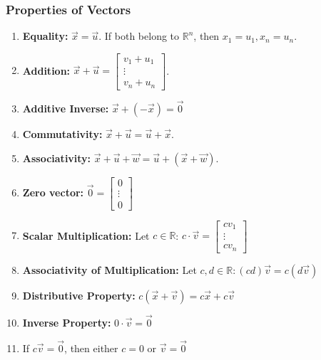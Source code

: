 \documentclass[11pt]{article}
\theoremstyle{plain}
\theoremstyle{remark}
\theoremstyle{plain}
\newcommand{\bd}{\textbf}
\newcommand{\rn}{\mathbb{R}}
\begin{document}
\subsubsection{Properties of Vectors}
\begin{enumerate}[label=\Roman*.]
    \item \bd{Equality:} $\overrightarrow{x} = \overrightarrow{u}$. If both belong to $\rn^n$, then $x_1 = u_1, x_n = u_n$.
    \item \bd{Addition:} $\overrightarrow{x} + \overrightarrow{u} = 
    \begin{bmatrix}
        v_1 + u_1 \\
        \vdots
        \\
        v_n + u_n
    \end{bmatrix}$.
    \item \bd{Additive Inverse:} $\overrightarrow{x} + (-\overrightarrow{x}) = \overrightarrow{0}$
    \item \bd{Commutativity:} $\overrightarrow{x} + \overrightarrow{u} = \overrightarrow{u} + \overrightarrow{x}$.
    \item \bd{Associativity:} $\overrightarrow{x} + \overrightarrow{u} + \overrightarrow{w} = \overrightarrow{u} + (\overrightarrow{x} + \overrightarrow{w})$.
    \item \bd{Zero vector:} $\overrightarrow{0} = \begin{bmatrix}
        0 \\\vdots \\0
    \end{bmatrix}$
    \item \bd{Scalar Multiplication:} Let $c\in\rn$: $ c\cdot \overrightarrow{v} = \begin{bmatrix}
        cv_1\\\vdots\\cv_n
    \end{bmatrix}$
    \item \bd{Associativity of Multiplication:} Let $c,d \in \rn: (cd)\overrightarrow{v} = c(d\overrightarrow{v})$
    \item \bd{Distributive Property:} $c(\overrightarrow{x} + \overrightarrow{v}) = c\overrightarrow{x} + c\overrightarrow{v}$
    \item \bd{Inverse Property:} $0 \cdot \overrightarrow{v} = \overrightarrow{0}$
    \item If $c\overrightarrow{v} = \overrightarrow{0}$, then either $c = 0$ or $\overrightarrow{v} = \overrightarrow{0}$
    \end{enumerate}
\end{document}
